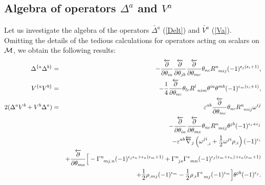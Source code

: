 \documentclass[a4paper,11pt]{article}
\begin{document}
\begin{appendix}
\section{Algebra of operators $\Delta^a$ and $V^a$}
\renewcommand{\theequation}{\thesection.\arabic{equation}}
\setcounter{equation}{0} \hspace*{\parindent}

Let us investigate the algebra of the operators
$\overleftarrow{\Delta^a}$ (\ref{Delt}) and $\overleftarrow{V^a}$
(\ref{Va}). Omitting the details of the tedious calculations for
operators acting on scalars on ${\cal M}$, we obtain the following
results:
\begin{eqnarray}
\label{B1}
 \Delta^{\{a}\Delta^{b\}}&=&-
 \frac{\overleftarrow{\partial}}{\partial\theta_{ia}}
 \frac{\overleftarrow{\partial}}{\partial\theta_{jb}}
 \frac{\overleftarrow{\partial}}{\partial\theta_{mc}}\theta_{nc}
R^n_{\;\;mij}(-1)^{\epsilon_j(\epsilon_i+1)},\\
\label{B2}
 V^{\{a}V^{b\}}&=&-\frac 14
\frac{\overleftarrow{\partial}}{\partial\theta_{nc}}
\theta_{lc}R^l_{\;\;nim}\theta^{ia}\theta^{mb}
(-1)^{\epsilon_m(\epsilon_i+1)},\\
\label{B3}
2(\Delta^aV^b+V^b\Delta^a)&=&
 \varepsilon^{ab}\frac{\overleftarrow{\partial}}{\partial\theta_{mc}}
\theta_{nc}R^n_{\;\;mij}\omega^{ij}\\
\nonumber && -
\frac{\overleftarrow{\partial}}{\partial\theta_{ia}}
\frac{\overleftarrow{\partial}}{\partial\theta_{mc}}\theta_{nc}
R^n_{\;\;mij}\theta^{jb}(-1)^{\epsilon_i+\epsilon_j}\\
 \nonumber &&
 - \varepsilon^{ab}\overleftarrow{\nabla}_j
\left(\omega^{ji}_{\;\;\;,i}
+\hbox{\Large$\frac{1}{2}$}\omega^{ji}\rho_{,i}\right)(-1)^{\epsilon_i} \\
\nonumber
&&+\frac{\overleftarrow{\partial}}{\partial\theta_{ma}}
\Big[-\Gamma^n_{\;\;mj.n}
(-1)^{\epsilon_j\epsilon_n+\epsilon_n(\epsilon_m+1)}+
\Gamma^n_{\;\;js}\Gamma^s_{\;\;mn}
(-1)^{\epsilon_j(\epsilon_m+\epsilon_n)+\epsilon_n(\epsilon_m+1)}\\
\nonumber &&
+\hbox{\Large$\frac{1}{2}$}\rho_{,mj}(-1)^{\epsilon_m}-
 \hbox{\Large$\frac{1}{2}$}\rho_{,i}\Gamma^i_{\;\;mj}(-1)^{\epsilon_m}\Big]
\theta^{jb}(-1)^{\epsilon_j}.
\end{eqnarray}


\end{appendix}
\end{document}

